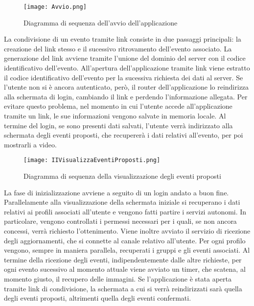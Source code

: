 \begin{figure}[h!]
    \begin{center}
        \texttt{[image: Avvio.png]}
        \caption{Diagramma di sequenza dell'avvio dell'applicazione}
    \end{center}
\end{figure}

La condivisione di un evento tramite link consiste in due passaggi principali: 
la creazione del link stesso e il sucessivo ritrovamento dell'evento associato.
La generazione del link avviene tramite l'unione del dominio del server con il codice identificativo dell'evento.
\clearpage
All'apertura dell'applicazione tramite link viene estratto il codice identificativo dell'evento 
per la sucessiva richiesta dei dati al server.
Se l'utente non si è ancora autenticato, però, il router dell'applicazione lo reindirizza alla schermata di login, 
cambiando il link e perdendo l'informazione allegata.
Per evitare questo problema, nel momento in cui l'utente accede all'applicazione tramite un link,
le sue informazioni vengono salvate in memoria locale.
Al termine del login, se sono presenti dati salvati, l'utente verrà indirizzato alla schermata degli eventi proposti, 
che recupererà i dati relativi all'evento, per poi mostrarli a video.

\begin{figure}[h!]
    \begin{center}
        \texttt{[image: IIVisualizzaEventiProposti.png]}
        \caption{Diagramma di sequenza della visualizzazione degli eventi proposti}
    \end{center}
\end{figure}

\clearpage

La fase di inizializzazione avviene a seguito di un login andato a buon fine.
Parallelamente alla visualizzazione della schermata iniziale si recuperano i dati 
relativi ai profili associati all'utente e vengono fatti partire i servizi autonomi. 
In particolare, vengono controllati i permessi necessari per i quali, se non ancora concessi, 
verrà richiesto l'ottenimento. 
Viene inoltre avviato il servizio di ricezione degli aggiornamenti, che si connette al canale relativo all'utente.
Per ogni profilo vengono, sempre in maniera parallela, recuperati i gruppi e gli eventi associati.
Al termine della ricezione degli eventi, indipendentemente dalle altre richieste, 
per ogni evento sucessivo al momento attuale viene avviato un timer, che scatena, 
al momento giusto, il recupero delle immagini.
Se l'applicazione è stata aperta tramite link di condivisione, 
la schermata a cui si verrà reindirizzati sarà quella degli eventi proposti, altrimenti quella degli eventi confermati.\\
\\

